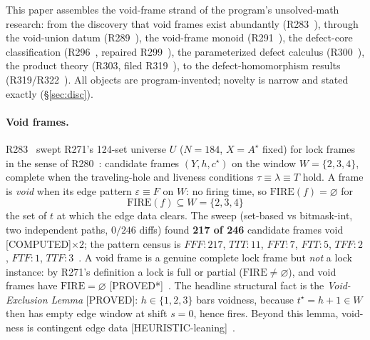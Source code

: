 \documentclass[11pt,a4paper]{article}
\theoremstyle{definition}
\begin{document}
This paper assembles the void-frame strand of the program's
unsolved-math research: from the discovery that void frames exist
abundantly (R283~\cite{D283}), through the void-union datum
(R289~\cite{D289}), the void-frame monoid (R291~\cite{D291}), the
defect-core classification (R296~\cite{D296}, repaired
R299~\cite{D299}), the parameterized defect calculus (R300~\cite{D300}),
the product theory (R303, filed R319~\cite{D319}), to the
defect-homomorphism results (R319/R322~\cite{D319,D322}). All objects
are program-invented; novelty is narrow and stated exactly
(\S\ref{sec:disc}).

\paragraph{Void frames.} R283~\cite{D283} swept R271's 124-set universe
$U$ ($N=184$, $X=A^\star$ fixed) for lock frames in the sense of
R280~\cite{D280}: candidate frames $(Y,h,c^\star)$ on the window
$W=\{2,3,4\}$, complete when the traveling-hole and liveness conditions
$\tau\equiv\lambda\equiv T$ hold. A frame is \emph{void} when its edge
pattern $\varepsilon\equiv F$ on $W$: no firing time, so
$\mathrm{FIRE}(f)=\varnothing$ for
\begin{equation}
  \label{eq:fire}
  \mathrm{FIRE}(f)\subseteq W=\{2,3,4\}
\end{equation}
the set of $t$ at which the edge data clears. The sweep (set-based vs
bitmask-int, two independent paths, $0/246$ diffs) found \textbf{217 of
246} candidate frames void [COMPUTED]$\times2$; the pattern census is
$FFF{:}217$, $TTT{:}11$, $FFT{:}7$, $FTT{:}5$, $TFF{:}2$, $FTF{:}1$,
$TTF{:}3$~\cite{D283}. A void frame is a genuine complete lock frame but
\emph{not} a lock instance: by R271's definition a lock is full or
partial ($\mathrm{FIRE}\ne\varnothing$), and void frames have
$\mathrm{FIRE}=\varnothing$ [PROVED*]~\cite{D283}. The headline
structural fact is the \emph{Void-Exclusion Lemma} [PROVED]:
$h\in\{1,2,3\}$ bars voidness, because $t^\star=h+1\in W$ then has empty
edge window at shift $s=0$, hence fires. Beyond this lemma, void-ness is
contingent edge data [HEURISTIC-leaning]~\cite{D283}.
\end{document}
